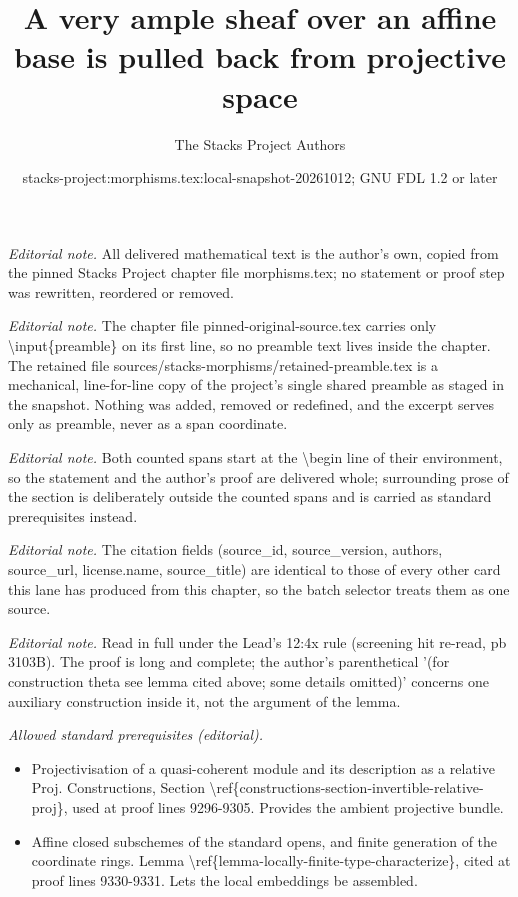 \documentclass[10pt,a4paper]{amsart}
\title{A very ample sheaf over an affine base is pulled back from projective space}
\author{The Stacks Project Authors}
\date{stacks-project:morphisms.tex:local-snapshot-20261012; GNU FDL 1.2 or later}
\theoremstyle{plain}
\theoremstyle{definition}
\theoremstyle{remark}
\numberwithin{equation}{subsection}
\begin{document}
\maketitle
\setcounter{subsection}{1}
\noindent\textit{Editorial note.} All delivered mathematical text is the author's own, copied from the pinned Stacks Project chapter file morphisms.tex; no statement or proof step was rewritten, reordered or removed.\par\medskip
\noindent\textit{Editorial note.} The chapter file pinned-original-source.tex carries only \textbackslash{}input\{preamble\} on its first line, so no preamble text lives inside the chapter. The retained file sources/stacks-morphisms/retained-preamble.tex is a mechanical, line-for-line copy of the project's single shared preamble as staged in the snapshot. Nothing was added, removed or redefined, and the excerpt serves only as preamble, never as a span coordinate.\par\medskip
\noindent\textit{Editorial note.} Both counted spans start at the \textbackslash{}begin line of their environment, so the statement and the author's proof are delivered whole; surrounding prose of the section is deliberately outside the counted spans and is carried as standard prerequisites instead.\par\medskip
\noindent\textit{Editorial note.} The citation fields (source\_id, source\_version, authors, source\_url, license.name, source\_title) are identical to those of every other card this lane has produced from this chapter, so the batch selector treats them as one source.\par\medskip
\noindent\textit{Editorial note.} Read in full under the Lead's 12:4x rule (screening hit re-read, pb 3103B). The proof is long and complete; the author's parenthetical '(for construction theta see lemma cited above; some details omitted)' concerns one auxiliary construction inside it, not the argument of the lemma.\par\medskip
\noindent\textit{Allowed standard prerequisites (editorial).}\begin{itemize}
\item Projectivisation of a quasi-coherent module and its description as a relative Proj. Constructions, Section \textbackslash{}ref\{constructions-section-invertible-relative-proj\}, used at proof lines 9296-9305. Provides the ambient projective bundle.
\item Affine closed subschemes of the standard opens, and finite generation of the coordinate rings. Lemma \textbackslash{}ref\{lemma-locally-finite-type-characterize\}, cited at proof lines 9330-9331. Lets the local embeddings be assembled.
\end{itemize}\medskip
\end{document}
